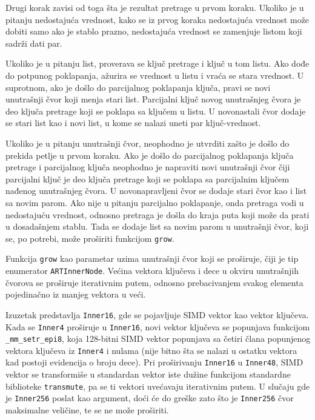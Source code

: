 \documentclass[12pt,oneside]{memoir}
\begin{document}
Drugi korak zavisi od toga šta je rezultat pretrage u prvom koraku.
Ukoliko je u pitanju nedostajuća vrednost, kako se iz prvog koraka
nedostajuća vrednost može dobiti samo ako je stablo prazno,
nedostajuća vrednost se zamenjuje listom koji sadrži dati par.

Ukoliko je u pitanju list, proverava se ključ pretrage i ključ u tom listu.
Ako dođe do potpunog poklapanja, ažurira se
vrednost u listu i vraća se stara vrednost.
U suprotnom, ako je došlo do parcijalnog poklapanja ključa,
pravi se novi unutrašnji čvor koji menja
stari list. Parcijalni ključ novog unutrašnjeg čvora
je deo ključa pretrage koji se poklapa sa ključem u listu.
U novonastali čvor dodaje se stari list kao i novi list,
u kome se nalazi uneti par ključ-vrednost.

Ukoliko je u pitanju unutrašnji čvor, neophodno je utvrditi zašto je došlo
do prekida petlje u prvom koraku. Ako je došlo do parcijalnog poklapanja
ključa pretrage i parcijalnog ključa
neophodno je napraviti novi unutrašnji čvor čiji parcijalni ključ
je deo ključa pretrage koji se poklapa sa
parcijalnim ključem nađenog unutrašnjeg čvora.
U novonapravljeni čvor se dodaje stari čvor kao i list sa novim parom.
Ako nije u pitanju parcijalno poklapanje, onda pretraga vodi u nedostajuću
vrednost, odnosno pretraga je došla do kraja puta koji može da prati u
dosadašnjem stablu.
Tada se dodaje list sa novim parom u unutrašnji
čvor, koji se, po potrebi, može proširiti funkcijom \texttt{grow}.

Funkcija \texttt{grow} kao parametar uzima unutrašnji čvor
koji se proširuje, čiji je tip enumerator
\texttt{ARTInnerNode}. Većina vektora ključeva i dece
u okviru unutrašnjih čvorova
se proširuje iterativnim putem, odnosno prebacivanjem svakog
elementa pojedinačno iz manjeg vektora u veći.

Izuzetak predstavlja \texttt{Inner16}, gde se pojavljuje
SIMD vektor kao vektor ključeva.
Kada se \texttt{Inner4} proširuje u \texttt{Inner16},
novi vektor ključeva se popunjava funkcijom \texttt{\_mm\_setr\_epi8},
koja 128-bitni SIMD vektor popunjava sa četiri člana
popunjenog vektora ključeva iz \texttt{Inner4}
i nulama (nije bitno šta se nalazi u ostatku vektora kad
postoji evidencija o broju dece). Pri proširivanju
\texttt{Inner16} u \texttt{Inner48}, SIMD vektor se
transformiše u standardan vektor iste dužine funkcijom
standardne biblioteke \texttt{transmute}, pa se
ti vektori uvećavaju iterativnim putem. U slučaju
gde je \texttt{Inner256} poslat kao argument,
doći će do greške zato što je \texttt{Inner256}
čvor maksimalne veličine, te se ne može
proširiti.
\end{document}

